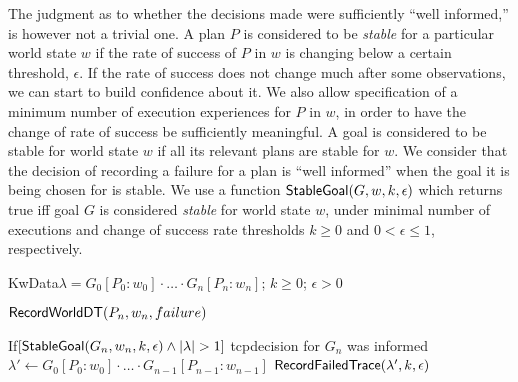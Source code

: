 
The judgment as to whether the decisions made were sufficiently ``well
informed,'' is however not a trivial one.  A plan $P$ is considered to
be \emph{stable} for a particular world state $w$ if the rate of
success of $P$ in $w$ is changing below a certain threshold,
$\epsilon$.
If the rate of success does not change much after some
observations, we can start to build confidence about it.
We also allow specification of a minimum number of execution
experiences for $P$ in $w$, in order to have the change of rate of
success be sufficiently meaningful. A goal is considered to be stable
for world state $w$ if all its relevant plans are stable for $w$.  We
consider that the decision of recording a failure for a plan is ``well
informed'' when the goal it is being chosen for is stable.  We use a function
$\mathsf{StableGoal}(G,w,k,\epsilon)$ which returns true iff goal $G$ is
considered \textit{stable} for world state $w$, under minimal
 number of executions and change of success rate thresholds $k \geq 0$
 and $0 < \epsilon \leq 1$, respectively.

\begin{algorithm}\caption{$\RecordTrace(\lambda,k,\epsilon)$}\label{algo:record_failed_exec}
KwData{$\lambda=G_0[P_0:w_0] \cdot \ldots \cdot G_n[P_n:w_n]$; $k\geq0$; $\epsilon > 0$}
\medskip

$\mathsf{RecordWorldDT}(P_n,w_n,failure)$

If{$[\StableGoal(G_n,w_n,k,\epsilon) \land |\lambda|>1]$} {
	tcp{\small decision for $G_n$ was informed}
	$\lambda' \longleftarrow G_0[P_0:w_0] \cdot \ldots \cdot G_{n-1}[P_{n-1}:w_{n-1}]$
	$\mathsf{RecordFailedTrace}(\lambda',k,\epsilon)$
}
\end{algorithm}

